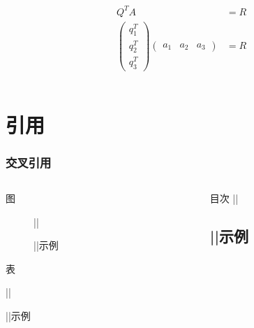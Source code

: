\begin{shadedsection}
\begin{frame}
\begin{columns}
\begin{column}{0.67\textwidth}
      \begin{exampleblock}{}
        \begin{align}
          Q^{T}A&=R \\
          \begin{pmatrix}
            q_1^T \\ q_2^T \\ q_3^T
          \end{pmatrix}
          \begin{pmatrix}
            a_1 & a_2 & a_3
          \end{pmatrix}
          &=R
        \end{align}
      \end{exampleblock}
    \end{column}
  \end{columns}
\end{frame}


\section{引用}
\begin{frame}[fragile]
  \frametitle{交叉引用}

  
  \begin{columns}
    \begin{column}{0.5\textwidth}
      \begin{codeblock}[]{图}
\begin{figure}
||  \caption{||示例}\label{fig:example}
\end{figure}
      \end{codeblock}
      \begin{codeblock}[]{表}
\begin{table}
||  \caption{||示例}\label{tab:example}
\end{table}
      \end{codeblock}
    \end{column}
    \begin{column}{0.5\textwidth}
\begin{codeblock}[]{目次}
||\section{||示例}\label{sec:example}
\end{codeblock}


\end{column}
\end{columns}
\end{frame}
\end{shadedsection}
